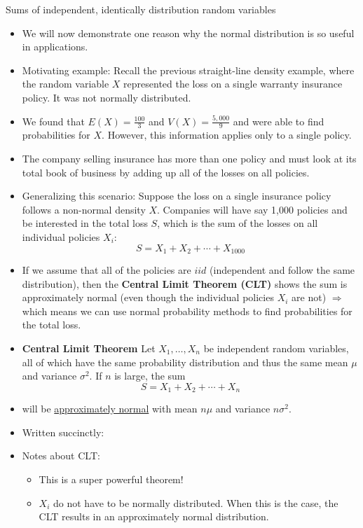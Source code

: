 \documentclass{article}
\newcommand{\vectwo}[2]{#1_1, \ldots, #1_{#2}}	%
\begin{document}
Sums of independent, identically distribution random variables\bigskip
\begin{itemize}
    \item We will now demonstrate one reason why the normal distribution is so useful in applications.
    \item Motivating example: Recall the previous straight-line density example, where the random variable $X$ represented the loss on a single warranty insurance policy. It was not normally distributed.
    \item[] We found that $E(X) = \frac{100}{3}$ and $V(X) = \frac{5,000}{9 }$ and were able to find probabilities for $X$. However, this information applies only to a single policy.
    \item[] The company selling insurance has more than one policy and must look at its total book of business by adding up all of the losses on all policies.\bigskip
    \item Generalizing this scenario: Suppose the loss on a single insurance policy follows a non-normal density $X$. Companies will have say 1,000 policies and be interested in the total loss $S$, which is the sum of the losses on all individual policies $X_i$:
    \[S = X_1 + X_2 + \cdots + X_{1000}\]
    \item If we assume that all of the policies are $iid$ (independent and follow the same distribution), then the \textbf{Central Limit Theorem (CLT)} shows the sum is approximately normal (even though the individual policies $X_i$ are not) $\Longrightarrow$ which means we can use normal probability methods to find probabilities for the total loss.\bigskip
    \item \textbf{Central Limit Theorem} Let $\vectwo{X}{n}$ be independent random variables, all of which have the same probability distribution and thus the same mean $\mu$ and variance $\sigma^2$. If $n$ is large, the sum
    \[S = X_1 + X_2 + \cdots + X_n\]
    \item[] will be \ul{approximately normal} with mean $n\mu$ and variance $n\sigma^2$.
    \item[] Written succinctly:\vspace{40pt}
    \item Notes about CLT:
    \begin{itemize}
        \item This is a super powerful theorem!
        \item $X_i$ do not have to be normally distributed. When this is the case, the CLT results in an approximately normal distribution.

\end{itemize}
\end{itemize}
\end{document}
